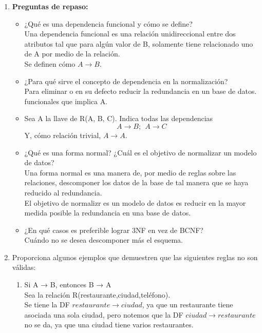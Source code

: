 \documentclass[a4paper, 12pt]{report}
\begin{document}
\begin{enumerate}
\item{
    \textbf{Preguntas de repaso:}
    \begin{itemize}
    \item{¿Qué es una dependencia funcional y cómo se define?\\
        Una dependencia funcional es una relación unidireccional entre dos
        atributos tal que para algún valor de B, solamente tiene relacionado uno
        de A por medio de la relación.\\
        Se definen cómo $A\rightarrow B$.
    }
    \item{¿Para qué sirve el concepto de dependencia en la normalización?\\
        Para eliminar o en su defecto reducir la redundancia en un base de datos.
    }
            funcionales que implica A.\\
    \item{Sea A la llave de R(A, B, C). Indica todas las dependencias
        $$A\rightarrow B;\ \ A\rightarrow C$$
        Y, cómo relación trivial, $A\rightarrow A$.
    }
    \item{¿Qué es una forma normal? ¿Cuál es el objetivo de normalizar un modelo
            de datos?\\
        Una forma normal es una manera de, por medio de reglas sobre las
        relaciones, descomponer los datos de la base de tal manera que se haya
        reducido al redundancia.\\
        El objetivo de normalizr es un modelo de datos es reducir en la mayor
        medida posible la redundancia en una base de datos.
    }
    \item{¿En qué casos es preferible lograr 3NF en vez de BCNF?\\
        Cuándo no se desea descomponer más el esquema.
    }
    \end{itemize}
}
\item {Proporciona algunos ejemplos que demuestren que las siguientes reglas
	no son válidas:
\begin{enumerate}
	\item Si A → B, entonces B → A\\
	Sea la relación R(restaurante,ciudad,teléfono).\\
	Se tiene la DF $restaurante \rightarrow ciudad$, ya que un restaurante tiene
	asociada una sola ciudad, pero notemos que la DF $ciudad \rightarrow
	restaurante$ no se da, ya que una ciudad tiene varios restaurantes. \\

\end{enumerate}}
\end{enumerate}
\end{document}
